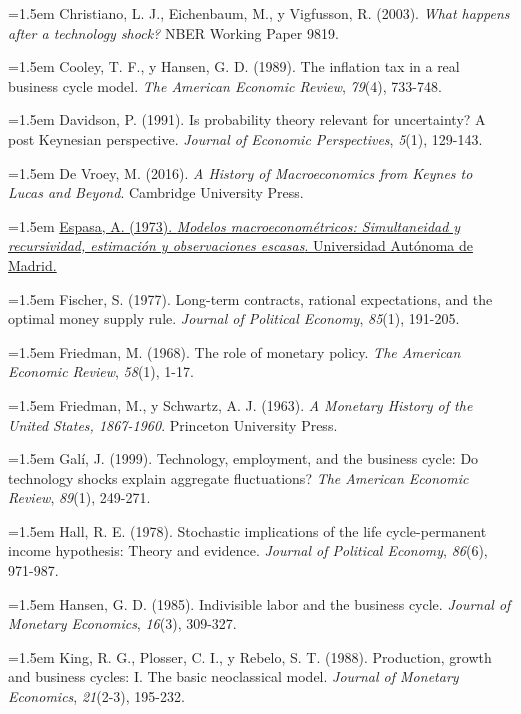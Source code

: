 \documentclass[10pt,a4paper]{article}
\begin{document}
\noindent\hangindent=1.5em Christiano, L. J., Eichenbaum, M., y Vigfusson, R. (2003). \textit{What happens after a technology shock?} NBER Working Paper 9819.

\noindent\hangindent=1.5em Cooley, T. F., y Hansen, G. D. (1989). The inflation tax in a real business cycle model. \textit{The American Economic Review}, \textit{79}(4), 733-748.

\noindent\hangindent=1.5em Davidson, P. (1991). Is probability theory relevant for uncertainty? A post Keynesian perspective. \textit{Journal of Economic Perspectives}, \textit{5}(1), 129-143.

\noindent\hangindent=1.5em De Vroey, M. (2016). \textit{A History of Macroeconomics from Keynes to Lucas and Beyond}. Cambridge University Press.

\noindent\hangindent=1.5em \href{https://repositorio.uam.es/entities/publication/256ba000-dcff-41e2-8801-40b03ad037f7}{Espasa, A. (1973). \textit{Modelos macroeconométricos: Simultaneidad y recursividad, estimación y observaciones escasas}. Universidad Autónoma de Madrid.}

\noindent\hangindent=1.5em Fischer, S. (1977). Long-term contracts, rational expectations, and the optimal money supply rule. \textit{Journal of Political Economy}, \textit{85}(1), 191-205.

\noindent\hangindent=1.5em Friedman, M. (1968). The role of monetary policy. \textit{The American Economic Review}, \textit{58}(1), 1-17.

\noindent\hangindent=1.5em Friedman, M., y Schwartz, A. J. (1963). \textit{A Monetary History of the United States, 1867-1960}. Princeton University Press.

\noindent\hangindent=1.5em Galí, J. (1999). Technology, employment, and the business cycle: Do technology shocks explain aggregate fluctuations? \textit{The American Economic Review}, \textit{89}(1), 249-271.

\noindent\hangindent=1.5em Hall, R. E. (1978). Stochastic implications of the life cycle-permanent income hypothesis: Theory and evidence. \textit{Journal of Political Economy}, \textit{86}(6), 971-987.

\noindent\hangindent=1.5em Hansen, G. D. (1985). Indivisible labor and the business cycle. \textit{Journal of Monetary Economics}, \textit{16}(3), 309-327.

\noindent\hangindent=1.5em King, R. G., Plosser, C. I., y Rebelo, S. T. (1988). Production, growth and business cycles: I. The basic neoclassical model. \textit{Journal of Monetary Economics}, \textit{21}(2-3), 195-232.
\end{document}
